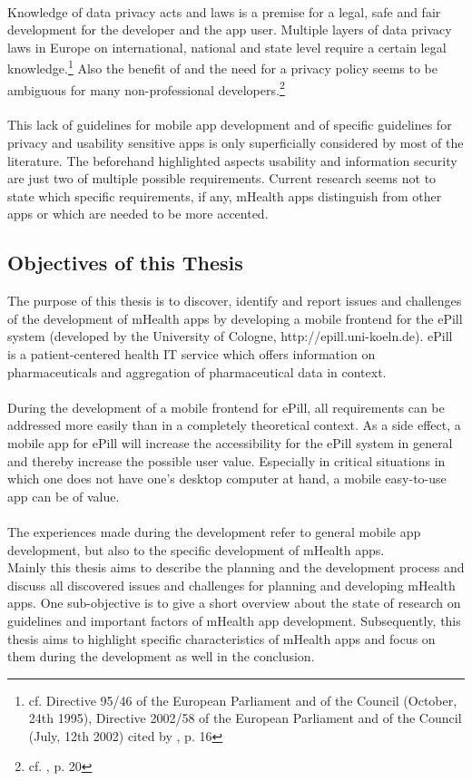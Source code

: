 \\
Knowledge of data privacy acts and laws is a premise for a legal, safe and fair development for the developer and the app user. Multiple layers of data privacy laws in Europe on international, national and state level require a certain legal knowledge.\footnote{cf. Directive 95/46 of the European Parliament and of the Council (October, 24th 1995), Directive 2002/58 of the European Parliament and of the Council (July, 12th 2002) cited by \cite{FutureofPrivacyForumCenterforDemocracy&Technology.2011}, p. 16} Also the benefit of and the need for a privacy policy seems to be ambiguous for many non-professional developers.\footnote{cf. \cite{Njie.2013}, p. 20}
\\
\\
This lack of guidelines for mobile app development and of specific guidelines for privacy and usability sensitive apps is only superficially considered by most of the literature. The beforehand highlighted aspects usability and information security are just two of multiple possible requirements. Current research seems not to state which specific requirements, if any, mHealth apps distinguish from other apps or which are needed to be more accented.

\subsection{Objectives of this Thesis}
The purpose of this thesis is to discover, identify and report issues and challenges of the development of mHealth apps by developing a mobile frontend for the ePill system (developed by the University of Cologne, http://epill.uni-koeln.de). ePill is a patient-centered health IT service which offers information on pharmaceuticals and aggregation of pharmaceutical data in context.
\\
\\
During the development of a mobile frontend for ePill, all requirements can be addressed more easily than in a completely theoretical context. As a side effect, a mobile app for ePill will increase the accessibility for the ePill system in general and thereby increase the possible user value. Especially in critical situations in which one does not have one's desktop computer at hand, a mobile easy-to-use app can be of value.
\\
\\
The experiences made during the development refer to general mobile app development, but also to the specific development of mHealth apps.
\\
Mainly this thesis aims to describe the planning and the development process and discuss all discovered issues and challenges for planning and developing mHealth apps. One sub-objective is to give a short overview about the state of research on guidelines and important factors of mHealth app development. Subsequently, this thesis aims to highlight specific characteristics of mHealth apps and focus on them during the development as well in the conclusion.